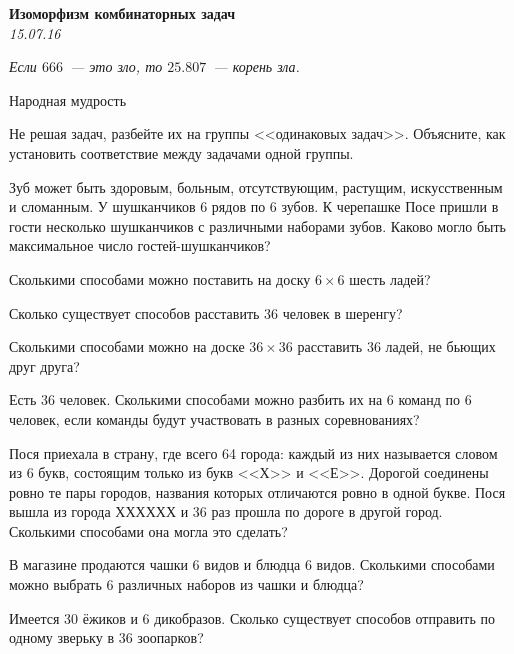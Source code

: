 \begin{center}
\textbf{\Large Изоморфизм комбинаторных задач}\\
\textit{15.07.16}
\end{center}

\epigraph{\it Если $666$~--- это зло, то $25.807$~--- корень зла.}{Народная мудрость}

Не решая задач, разбейте их на группы <<одинаковых задач>>. Объясните, как установить соответствие между задачами одной группы.

\begin{problems}

\item Зуб может быть здоровым, больным, отсутствующим, растущим, искусственным и сломанным. У шушканчиков 6 рядов по 6 зубов. К черепашке Посе пришли в гости несколько шушканчиков с различными наборами зубов. Каково могло быть максимальное число гостей-шушканчиков? %

\item Сколькими способами можно поставить на доску $6\times6$ шесть ладей? %

\item Сколько существует способов расставить 36 человек в шеренгу? %

\item Сколькими способами можно на доске $36\times36$  расставить 36 ладей, не бьющих друг друга? %

\item Есть 36 человек. Сколькими способами можно разбить их на 6 команд по 6 человек, если команды будут участвовать в разных соревнованиях? %

\item Пося приехала в страну, где всего 64 города: каждый из них называется словом из 6 букв, состоящим только из букв <<Х>> и <<Е>>. Дорогой соединены ровно те пары городов, названия которых отличаются ровно в одной букве. Пося вышла из города ХХХХХХ и 36 раз прошла по дороге в другой город. Сколькими способами она могла это сделать? %

\item В магазине продаются чашки 6 видов и блюдца 6 видов. Сколькими способами можно выбрать 6 различных наборов из чашки и блюдца? %

\item Имеется 30 ёжиков и 6 дикобразов. Сколько существует способов отправить по одному зверьку в 36 зоопарков? %


\end{problems}
